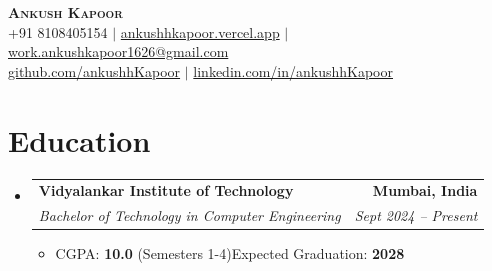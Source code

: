 \documentclass[letterpaper,11pt]{article}
\makeatletter
\newcommand{\resumeItem}[1]{
  \item\small{
    {#1 \vspace{-3pt}}
  }
}
\newcommand{\resumeSubheading}[4]{
  \vspace{-2pt}\item
    \begin{tabular*}{1.0\textwidth}[t]{l@{\extracolsep{\fill}}r}
      \vspace{-2pt}\textbf{#1} & \textbf{\small #2} \\
      \textit{\small#3} & \textit{\small #4} \\
    \end{tabular*}\vspace{-8pt}
} %
\newcommand{\resumeSubHeadingListStart}{\begin{itemize}[leftmargin=0.0in, label={}]}
\newcommand{\resumeSubHeadingListEnd}{\end{itemize}}
\newcommand{\resumeItemListStart}{\begin{itemize}}
\newcommand{\resumeItemListEnd}{\end{itemize}\vspace{-9pt}}
\makeatother
\begin{document}

\begin{center}
    {\huge \scshape \textbf{Ankush Kapoor}} \\ \vspace{2pt}
    +91 8108405154 $|$  \href{https://ankushhkapoor.vercel.app}{ankushhkapoor.vercel.app} $|$
    \href{mailto:work.ankushkapoor1626@gmail.com}{work.ankushkapoor1626@gmail.com} \\
    \href{https://github.com/ankushhKapoor}{github.com/ankushhKapoor} $|$
    \href{https://linkedin.com/in/ankushhKapoor}{linkedin.com/in/ankushhKapoor}    \vspace{-8pt}
    \vspace{-5pt}
\end{center}

\section{Education}
    \resumeSubHeadingListStart
        \resumeSubheading
            {Vidyalankar Institute of Technology}{Mumbai, India}
            {Bachelor of Technology in Computer Engineering}{Sept 2024 -- Present}
            \resumeItemListStart
                \resumeItem{CGPA: \textbf{10.0} (Semesters 1-4)\hfill Expected Graduation: \textbf{2028}\hspace{-5pt}}
            \resumeItemListEnd
    \resumeSubHeadingListEnd
\vspace{-13pt}
\end{document}
